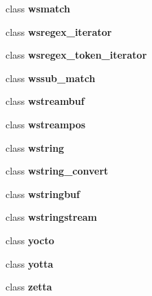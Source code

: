 \begin{DoxyCompactItemize}
class \textbf{ wsmatch}
\item 
class \textbf{ wsregex\+\_\+iterator}
\item 
class \textbf{ wsregex\+\_\+token\+\_\+iterator}
\item 
class \textbf{ wssub\+\_\+match}
\item 
class \textbf{ wstreambuf}
\item 
class \textbf{ wstreampos}
\item 
class \textbf{ wstring}
\item 
class \textbf{ wstring\+\_\+convert}
\item 
class \textbf{ wstringbuf}
\item 
class \textbf{ wstringstream}
\item 
class \textbf{ yocto}
\item 
class \textbf{ yotta}
\item 
class \textbf{ zetta}
\end{DoxyCompactItemize}
